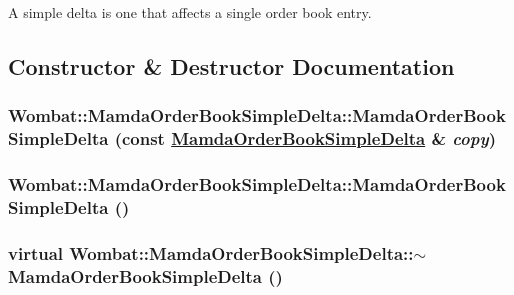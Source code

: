 A simple delta is one that affects a single order book entry. 



\subsection{Constructor \& Destructor Documentation}
\hypertarget{classWombat_1_1MamdaOrderBookSimpleDelta_e7f8d3c6b0556bc6b735e3d365bdb58a}{
\subsubsection[MamdaOrderBookSimpleDelta]{\setlength{\rightskip}{0pt plus 5cm}Wombat::Mamda\-Order\-Book\-Simple\-Delta::Mamda\-Order\-Book\-Simple\-Delta (const \hyperlink{classWombat_1_1MamdaOrderBookSimpleDelta}{Mamda\-Order\-Book\-Simple\-Delta} \& {\em copy})}}
\label{classWombat_1_1MamdaOrderBookSimpleDelta_e7f8d3c6b0556bc6b735e3d365bdb58a}


\hypertarget{classWombat_1_1MamdaOrderBookSimpleDelta_2ca9475d473cb990f89ca4622d9bfdb2}{
\subsubsection[MamdaOrderBookSimpleDelta]{\setlength{\rightskip}{0pt plus 5cm}Wombat::Mamda\-Order\-Book\-Simple\-Delta::Mamda\-Order\-Book\-Simple\-Delta ()}}
\label{classWombat_1_1MamdaOrderBookSimpleDelta_2ca9475d473cb990f89ca4622d9bfdb2}


\hypertarget{classWombat_1_1MamdaOrderBookSimpleDelta_8116bb05f71ee09a5b3dbaab0165c12d}{
\subsubsection[$\sim$MamdaOrderBookSimpleDelta]{\setlength{\rightskip}{0pt plus 5cm}virtual Wombat::Mamda\-Order\-Book\-Simple\-Delta::$\sim$Mamda\-Order\-Book\-Simple\-Delta ()}}
\label{classWombat_1_1MamdaOrderBookSimpleDelta_8116bb05f71ee09a5b3dbaab0165c12d}


